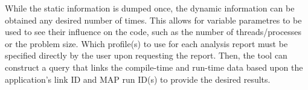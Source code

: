 While the static information is dumped once, the dynamic information can be obtained any desired number of times.
This allows for variable parametres to be used to see their influence on the code, such as the number of threads/processes or the problem size.
Which profile(s) to use for each analysis report must be specified directly by the user upon requesting the report.
Then, the tool can construct a query that links the compile-time and run-time data based upon the application's link ID and MAP run ID(s) to provide the desired results.
